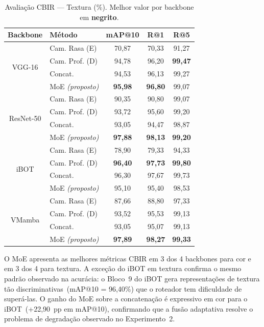 \documentclass[letterpaper, 10 pt, conference]{ieeeconf}
\begin{document}
\begin{table}[htbp]
\caption{Avaliação CBIR — Textura (\%). Melhor valor por backbone em
         \textbf{negrito}.}
\begin{center}
\begin{tabular}{c|l|c|c|c}
\hline
\textbf{Backbone} & \textbf{Método} & \textbf{mAP@10}
                  & \textbf{R@1} & \textbf{R@5} \\
\hline
\multirow{4}{*}{VGG-16}
  & Cam. Rasa (E)           & 70,87 & 70,33 & 91,27 \\
  & Cam. Prof. (D)          & 94,78 & 96,20 & \textbf{99,47} \\
  & Concat.                 & 94,53 & 96,13 & 99,27 \\
  & MoE \textit{(proposto)} & \textbf{95,98} & \textbf{96,80} & 99,07 \\
\hline
\multirow{4}{*}{ResNet-50}
  & Cam. Rasa (E)           & 90,35 & 90,80 & 99,07 \\
  & Cam. Prof. (D)          & 93,72 & 95,60 & 99,20 \\
  & Concat.                 & 93,05 & 94,47 & 98,87 \\
  & MoE \textit{(proposto)} & \textbf{97,88} & \textbf{98,13} & \textbf{99,20} \\
\hline
\multirow{4}{*}{iBOT}
  & Cam. Rasa (E)           & 78,90 & 79,33 & 94,33 \\
  & Cam. Prof. (D)          & \textbf{96,40} & \textbf{97,73} & \textbf{99,80} \\
  & Concat.                 & 96,30 & 97,67 & 99,73 \\
  & MoE \textit{(proposto)} & 95,10 & 95,40 & 98,53 \\
\hline
\multirow{4}{*}{VMamba}
  & Cam. Rasa (E)           & 87,66 & 88,80 & 97,33 \\
  & Cam. Prof. (D)          & 93,52 & 95,53 & 99,13 \\
  & Concat.                 & 93,05 & 95,07 & 99,13 \\
  & MoE \textit{(proposto)} & \textbf{97,89} & \textbf{98,27} & \textbf{99,33} \\
\hline
\end{tabular}
\label{tab_cbir_texture}
\end{center}
\end{table}

O MoE apresenta as melhores métricas CBIR em 3 dos 4 backbones para cor
e em 3 dos 4 para textura.
A exceção do iBOT em textura confirma o mesmo padrão observado na
acurácia: o Bloco~9 do iBOT gera representações de textura tão
discriminativas~(mAP@10 = 96,40\%) que o roteador tem dificuldade de
superá-las.
O ganho do MoE sobre a concatenação é expressivo em cor para o
iBOT~(+22,90~pp em mAP@10), confirmando que a fusão adaptativa resolve
o problema de degradação observado no Experimento~2.
\end{document}
